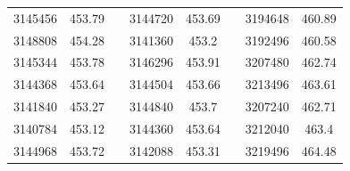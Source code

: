 \documentclass[12pt]{mwart}
\begin{document}
\begin{table}[H]
\begin{tabular}{cclcclcc}
		3145456                                                  & 453.79                                                        &  & 3144720                                                  & 453.69                                                        &  & 3194648                                                  & 460.89                                                        \\
		3148808                                                  & 454.28                                                        &  & 3141360                                                  & 453.2                                                         &  & 3192496                                                  & 460.58                                                        \\
		3145344                                                  & 453.78                                                        &  & 3146296                                                  & 453.91                                                        &  & 3207480                                                  & 462.74                                                        \\
		3144368                                                  & 453.64                                                        &  & 3144504                                                  & 453.66                                                        &  & 3213496                                                  & 463.61                                                        \\
		3141840                                                  & 453.27                                                        &  & 3144840                                                  & 453.7                                                         &  & 3207240                                                  & 462.71                                                        \\
		3140784                                                  & 453.12                                                        &  & 3144360                                                  & 453.64                                                        &  & 3212040                                                  & 463.4                                                         \\
		3144968                                                  & 453.72                                                        &  & 3142088                                                  & 453.31                                                        &  & 3219496                                                  & 464.48                                                        \\

\end{tabular}
\end{table}
\end{document}
